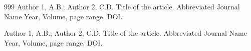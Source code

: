 \documentclass[journal,article,submit,moreauthors,pdftex,10pt,a4paper]{mdpi}
\begin{document}



\begin{thebibliography}{999}
Author 1, A.B.; Author 2, C.D. Title of the article. Abbreviated Journal Name Year, Volume, page range, DOI.

Author 1, A.B.; Author 2, C.D. Title of the article. Abbreviated Journal Name Year, Volume, page range, DOI.

\end{thebibliography}
\end{document}
